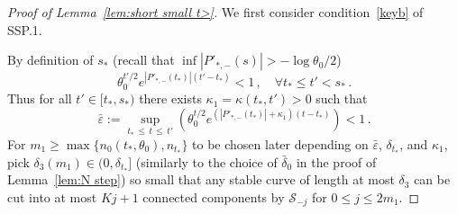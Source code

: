 \documentclass[10pt]{amsart}
\theoremstyle{definition}\newtheorem{defi}[theo]{Definition}\newtheorem{rema}[theo]{Remark}\newtheorem{exam}[theo]{Example}\newtheorem{exem}[theo]{Example}\newtheorem{nota}[theo]{Notation}
\newcommand{\cS}{\mathcal{S}}
\newcommand{\ve}{\varepsilon}
\let\oldforall\forall
\renewcommand*{\forall}{\mathrel{\oldforall}}
\begin{document}
\begin{proof}[Proof of Lemma~\ref{lem:short small t>}]
We first consider condition~\eqref{keyb} of SSP.1.

By definition of $s_*$ (recall that $\inf |P'_{*,-}(s)|>-\log \theta_0/2$)
\begin{equation}\label{choice'}
\theta_0^{t'/2} e^{\left| P'_{*,-}(t_*)\right| (t'-t_*)} < 1\,,\quad
\forall t_*\le t' < s_*\,.
\end{equation}
Thus for all $t' \in [t_*, s_*)$ there exists $ \kappa_1 = \kappa(t_*, t') >0$ such that
\begin{equation}\label{nofoot}
\bar \ve := \sup_{t_*\,\le\,t\,\le\,t'}\left(\theta_0^{t/2} e^{\left(\left| P'_{*,-}(t_*)\right| + \kappa_1\right)(t-t_*)}\right) < 1\,.
\end{equation}
For $m_1\ge \max\{n_0(t_*,\theta_0),n_{t_*}\}$ to be chosen later depending on $\bar \ve$, $\delta_{t_*}$, and $\kappa_1$, pick $\delta_3(m_1){\in (0, \delta_{t_*}]}$ (similarly to the choice of $\bar \delta_0$ in the proof of Lemma~\ref{lem:N step}) so small that any stable curve of length at most $\delta_3$ can be cut into at most $Kj+1$ connected components by $\cS_{-j}$ for $0 \le j \le 2m_1$.




\end{proof}
\end{document}
